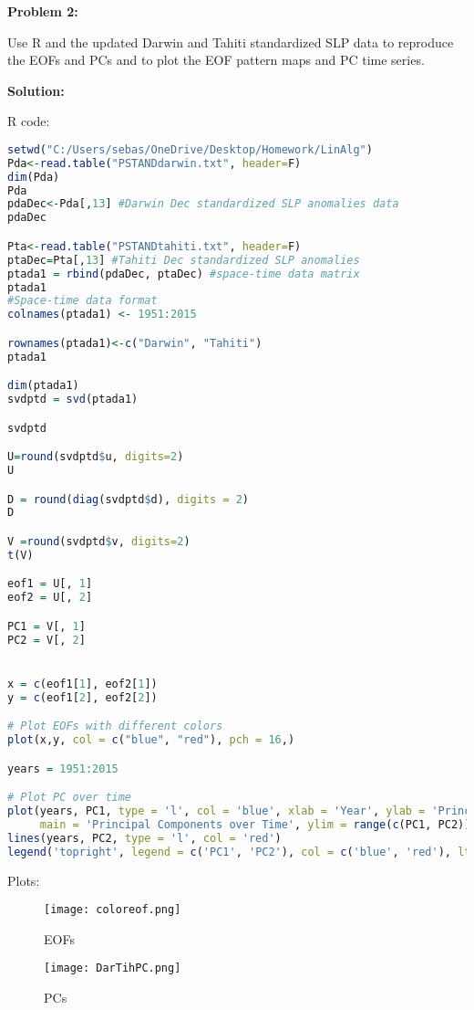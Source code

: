 \documentclass[12pt]{article}
\newenvironment{problem}[1]{
    \textbf{Problem #1:}
}{
    \rmfamily \vspace{1em}
}
\newenvironment{solution}{
    \textbf{Solution:}
    
}{
    
    \vspace{2em}
}
\begin{document}
\begin{problem}{2}
    Use R and the updated Darwin and Tahiti standardized SLP data to reproduce the EOFs and PCs and to plot the EOF pattern maps and PC time series.
\end{problem}

\begin{solution}
    R code:
    \begin{lstlisting}[language=R]
setwd("C:/Users/sebas/OneDrive/Desktop/Homework/LinAlg")
Pda<-read.table("PSTANDdarwin.txt", header=F)
dim(Pda) 
Pda
pdaDec<-Pda[,13] #Darwin Dec standardized SLP anomalies data
pdaDec

Pta<-read.table("PSTANDtahiti.txt", header=F)
ptaDec=Pta[,13] #Tahiti Dec standardized SLP anomalies
ptada1 = rbind(pdaDec, ptaDec) #space-time data matrix
ptada1
#Space-time data format
colnames(ptada1) <- 1951:2015

rownames(ptada1)<-c("Darwin", "Tahiti")
ptada1

dim(ptada1)
svdptd = svd(ptada1)

svdptd

U=round(svdptd$u, digits=2)
U

D = round(diag(svdptd$d), digits = 2)
D

V =round(svdptd$v, digits=2)
t(V)

eof1 = U[, 1]
eof2 = U[, 2]

PC1 = V[, 1]
PC2 = V[, 2]


x = c(eof1[1], eof2[1])
y = c(eof1[2], eof2[2])

# Plot EOFs with different colors
plot(x,y, col = c("blue", "red"), pch = 16,)

years = 1951:2015

# Plot PC over time
plot(years, PC1, type = 'l', col = 'blue', xlab = 'Year', ylab = 'Principal Component Value', 
     main = 'Principal Components over Time', ylim = range(c(PC1, PC2)))
lines(years, PC2, type = 'l', col = 'red')
legend('topright', legend = c('PC1', 'PC2'), col = c('blue', 'red'), lty = 1)
    \end{lstlisting}
    Plots:
    \begin{figure}[H]
        \centering
        \texttt{[image: coloreof.png]}
        \caption{EOFs}
    \end{figure}
    \begin{figure}[H]
        \centering
        \texttt{[image: DarTihPC.png]}
        \caption{PCs}
    \end{figure}
\end{solution}
\end{document}
